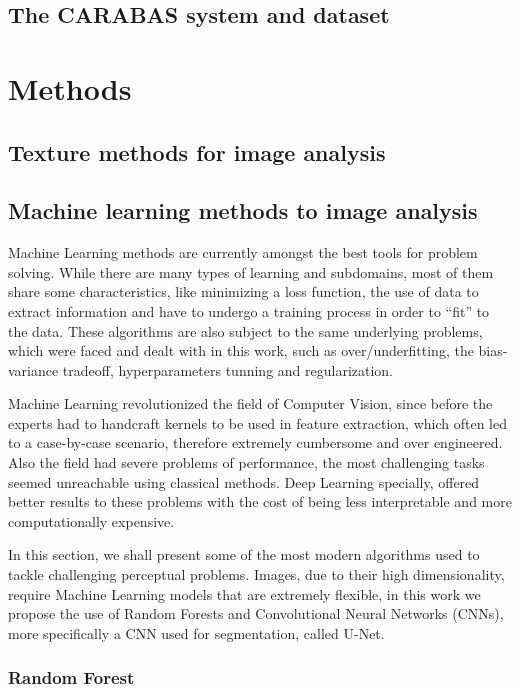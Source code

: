 \subsection{The CARABAS system and dataset}

\section{Methods}
\subsection{Texture methods for image analysis}
\subsection{Machine learning methods to image analysis}

Machine Learning methods are currently amongst the best tools for problem solving. While there are many types of learning and subdomains, most of them share some characteristics, like minimizing a loss function, the use of data to extract information and have to undergo a training process in order to ``fit'' to the data. These algorithms are also subject to the same underlying problems, which were faced and dealt with in this work, such as over/underfitting, the bias-variance tradeoff, hyperparameters tunning and regularization.

Machine Learning revolutionized the field of Computer Vision, since before the experts had to handcraft kernels to be used in feature extraction, which often led to a case-by-case scenario, therefore  extremely cumbersome and over engineered. Also the field had severe problems of performance, the most challenging tasks seemed unreachable using classical methods. Deep Learning specially, offered better results to these problems with the cost of being less interpretable and more computationally expensive. 

In this section, we shall present some of the most modern algorithms used to tackle challenging perceptual problems. Images, due to their high dimensionality, require Machine Learning models that are extremely flexible, in this work we propose the use of Random Forests and Convolutional Neural Networks (CNNs), more specifically a CNN used for segmentation, called U-Net.

\subsubsection{Random Forest}


